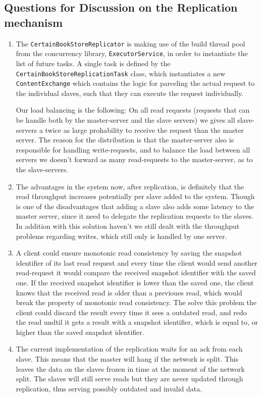 \documentclass[10pt,a4paper]{article}
\begin{document}
\subsection*{Questions for Discussion on the Replication mechanism}
\begin{enumerate}
	\item The \texttt{CertainBookStoreReplicator} is making use of the build thread pool from the concurrency library, \texttt{ExecutorService}, in order to instantiate the list of future tasks. A single task is defined by the \texttt{CertainBookStore\-ReplicationTask} class, which instantiates a new \texttt{ContentExchange} which contains the logic for parceling the actual request to the individual slaves, such that they can execute the request individually.
	\newline
	
	Our load balancing is the following: On all read requests (requests that can be handle both by the master-server and the slave servers) we gives all slave-servers a twice as large prohability to receive the request than the master server. The reason for the distribution is that the master-server also is responsible for handling write-requests, and to balance the load between all servers we doesn't forward as many read-requests to the master-server, as to the slave-servers.
	\item The advantages in the system now, after replication, is definitely that the read throughput increases potentially per slave added to the system. Though is one of the disadvantages that adding a slave also adds some latency to the master server, since it need to delegate the replication requests to the slaves. In addition with this solution haven't we still dealt with the throughput problems regarding writes, which still only is handled by one server.
	\item A client could ensure monotonic read consistency by saving the snapshot identifier of its last read request and every time the client would send another read-request it would compare the received snapshot identifier with the saved one. If the received snapshot identifier is lower than the saved one, the client knows that the received read is older than a previoues read, which would break the property of monotonic read consistency. The solve this problem the client could discard the result every time it sees a outdated read, and redo the read undtil it gets a result with a snapshot identifier, which is equal to, or higher than the saved snapshot identifier.
	\item The current implementation of the replication waits for an ack from each slave. This means that the master will hang if the network is split. This leaves the data on the slaves frozen in time at the moment of the network split. The slaves will still serve reads but they are never updated through replication, thus serving possibly outdated and invalid data.
\end{enumerate}
\end{document}
